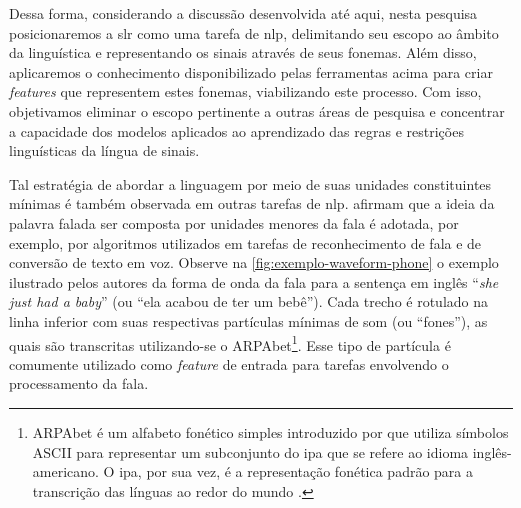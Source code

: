 

Dessa forma, considerando a discussão desenvolvida até aqui, nesta pesquisa posicionaremos a \acrshort{slr} como uma tarefa de \acrshort{nlp}, delimitando seu escopo ao âmbito da linguística e representando os sinais através de seus fonemas. Além disso, aplicaremos o conhecimento disponibilizado pelas ferramentas acima para criar \textit{features} que representem estes fonemas, viabilizando este processo.
Com isso, objetivamos eliminar o escopo pertinente a outras áreas de pesquisa e concentrar a capacidade dos modelos aplicados ao aprendizado das regras e restrições linguísticas da língua de sinais.

Tal estratégia de abordar a linguagem por meio de suas unidades constituintes mínimas é também observada em outras tarefas de \acrshort{nlp}.  afirmam que a ideia da palavra falada ser composta por unidades menores da fala é adotada, por exemplo, por algoritmos utilizados em tarefas de reconhecimento de fala e de conversão de texto em voz.
Observe na \autoref{fig:exemplo-waveform-phone} o exemplo ilustrado pelos autores da forma de onda da fala para a sentença em inglês ``\textit{she just had a baby}'' (ou ``ela acabou de ter um bebê'').
Cada trecho é rotulado na linha inferior com suas respectivas partículas mínimas de som (ou ``fones''), as quais são transcritas utilizando-se o ARPAbet\footnote{
    ARPAbet é um alfabeto fonético simples introduzido por  que utiliza símbolos ASCII para representar um subconjunto do \acrshort{ipa} que se refere ao idioma inglês-americano. O \acrfull{ipa}, por sua vez, é a representação fonética padrão para a transcrição das línguas ao redor do mundo \cite{jurafsky-2022-speech-lang-processing}.
}. Esse tipo de partícula é comumente utilizado como \textit{feature} de entrada para tarefas envolvendo o processamento da fala.


